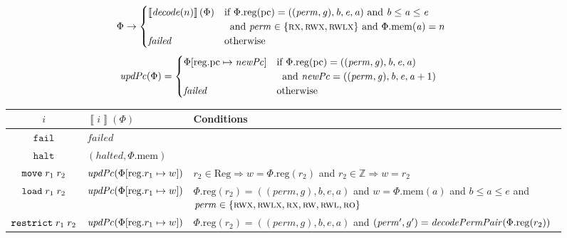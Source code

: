 \documentclass[format=acmsmall, review=true, screen=true]{acmart}
\newcommand{\update}[2]{[#1 \mapsto #2]}
\newcommand{\sem}[1]{\left\llbracket #1 \right\rrbracket}
\newcommand{\var}[1]{\mathit{#1}}
\newcommand{\gl}{\var{g}}
\newcommand{\pcreg}{\mathrm{pc}}
\newcommand{\addr}{\var{a}}
\newcommand{\start}{\var{b}}
\newcommand{\addrend}{\var{e}}
\newcommand{\perm}{\var{perm}}
\newcommand{\stdcap}[1][(\perm,\gl)]{\left(#1,\start,\addrend,\addr \right)}
\newcommand{\plainproj}[1]{\mathrm{#1}}
\newcommand{\memheap}[1][\Phi]{#1.\plainproj{mem}}
\newcommand{\memreg}[1][\Phi]{#1.\plainproj{reg}}
\newcommand{\updateReg}[3][\Phi]{#1\update{\plainproj{reg}.#2}{#3}}
\newcommand{\failed}{\mathit{failed}}
\newcommand{\halted}{\mathit{halted}}
\newcommand{\plainfun}[2]{
  \ifthenelse{\equal{#2}{}}
  {\mathit{#1}}
  {\mathit{#1}(#2)}
}
\newcommand{\decode}{\plainfun{decode}{}}
\newcommand{\decodePermPair}{\plainfun{decodePermPair}}
\newcommand{\stdUpdatePc}[1]{\plainfun{updPc}{#1}}
\newcommand{\plaindom}[1]{\mathrm{#1}}
\newcommand{\Regs}{\plaindom{Reg}}
\newcommand{\ints}{\mathbb{Z}}
\newcommand{\refreg}[1]{#1}
\newcommand{\refheap}[1]{#1}
\newcommand{\zinstr}[1]{\mathtt{#1}}
\newcommand{\fail}{\zinstr{fail}}
\newcommand{\halt}{\zinstr{halt}}
\newcommand{\twoinstr}[3]{
  \ifthenelse{\equal{#2#3}{}}
  {\zinstr{#1}}
  {\zinstr{#1} \; #2 \; #3}
}
\newcommand{\restricttwo}[2]{\twoinstr{restrict}{#1}{#2}}
\newcommand{\move}[2]{\twoinstr{move}{#1}{#2}}
\newcommand{\load}[2]{\twoinstr{load}{#1}{#2}}
\newcommand{\plainperm}[1]{\textsc{#1}}
\newcommand{\readonly}{\plainperm{ro}}
\newcommand{\readwrite}{\plainperm{rw}}
\newcommand{\exec}{\plainperm{rx}}
\newcommand{\rwx}{\plainperm{rwx}}
\newcommand{\readwritel}{\plainperm{rwl}}
\newcommand{\rwlx}{\plainperm{rwlx}}
\begin{document}
\begin{figure}[htb]
  \centering
  \begin{equation*}
    \Phi  \rightarrow
    \begin{cases}
      \sem{\decode(n)}(\Phi) & \arraycolsep=0pt
      \begin{array}[t]{l}
        \text{if $\memreg(\pcreg) = \stdcap$ and $\start \leq \addr \leq \addrend$}\\ 
        \text{\;\;and $\perm \in \{ \exec,\rwx, \rwlx \}$ and $\memheap(\addr) = n$ }
      \end{array}
\\
      \failed                                 & \text{otherwise}
    \end{cases}
  \end{equation*}
  \begin{align*}
    \stdUpdatePc{\Phi} &=
                         \begin{cases}
                           \updateReg{\pcreg}{\var{newPc}} & \arraycolsep=0pt
                           \begin{array}[t]{l}
                             \text{if $\memreg(\pcreg) = \stdcap$}\\
                             \text{\;\;and $\var{newPc} = ((\perm,\gl),\start,\addrend,\addr + 1)$}
                           \end{array}
\\
                             \failed & \text{otherwise}
                         \end{cases}
  \end{align*}
  \begin{tabular}{|c|p{3.4cm}|>{\raggedright\arraybackslash}p{7.3cm}|}
    \hline
    $i$&$\sem{i}(\Phi)$&Conditions\\
    \hline 
    $\fail$&$\failed$&\\
    \hline
    $\halt$&$(\halted,\memheap)$&\\
    \hline
    $\move{\refreg{r_1}}{r_2}$& $\stdUpdatePc{}(\updateReg{r_1}{w})$&$r_2 \in \Regs \Rightarrow w = \memreg(r_2)$ and $r_2 \in \ints \Rightarrow w = r_2$\\
    \hline
    $\load{\refreg{r_1}}{\refheap{r_2}}$&$\stdUpdatePc{\updateReg{r_1}{w}}$&$\memreg(r_2) = \stdcap{}$ and  $w = \memheap(\addr)$ and $\start \leq \addr \leq \addrend$ and $\perm \in \{ \rwx, \rwlx, \exec, \readwrite, \readwritel, \readonly \}$ \\
    \hline
    $\restricttwo{\refreg{r_1}}{r_2}$&$\stdUpdatePc{}(\updateReg{r_1}{w})$  & $\memreg(r_2) = \stdcap$ and $(\perm',g') = \decodePermPair{\memreg(r_2)}$

\end{tabular}
\end{figure}
\end{document}
